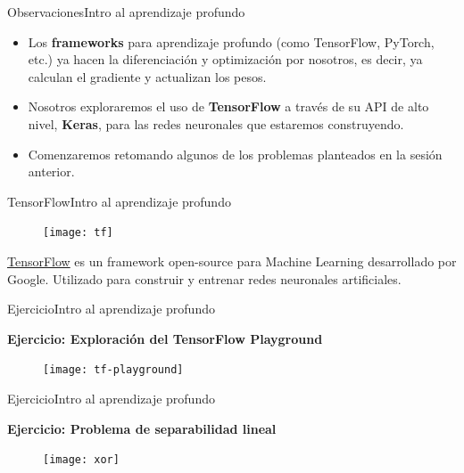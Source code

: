 \documentclass[10pt,border=3pt,tikz]{beamer}
\begin{document}
    \begin{frame}{Observaciones}{Intro al aprendizaje profundo}
        \begin{itemize}
            \item Los \textbf{frameworks} para aprendizaje profundo (como TensorFlow, PyTorch, etc.) ya hacen la diferenciación y optimización por nosotros, es decir, ya calculan el gradiente y actualizan los pesos.
            \item Nosotros exploraremos el uso de \textbf{TensorFlow} a través de su API de alto nivel, \textbf{Keras}, para las redes neuronales que estaremos construyendo.
            \item Comenzaremos retomando algunos de los problemas planteados en la sesión anterior.
        \end{itemize}
    \end{frame}
    
    \begin{frame}{TensorFlow}{Intro al aprendizaje profundo}
        \begin{center}
            \begin{figure}
                \centering
                \texttt{[image: tf]}
            \end{figure}
            \colorbox{blue!10}{\href{https://www.tensorflow.org/}{TensorFlow}} es un framework open-source para Machine Learning desarrollado por Google. Utilizado para construir y entrenar redes neuronales artificiales.
        \end{center}
    \end{frame}
    
    \begin{frame}{Ejercicio}{Intro al aprendizaje profundo}
        \begin{center}
            {\Large \textbf{Ejercicio: Exploración del TensorFlow Playground}}
        \end{center}
        \begin{figure}
            \centering
            \texttt{[image: tf-playground]}
        \end{figure}
    \end{frame}
    
    \begin{frame}{Ejercicio}{Intro al aprendizaje profundo}
        \begin{center}
            {\Large \textbf{Ejercicio: Problema de separabilidad lineal}}
        \end{center}
        \begin{figure}
            \centering
            \texttt{[image: xor]}
        \end{figure}
    \end{frame}
    
\end{document}

